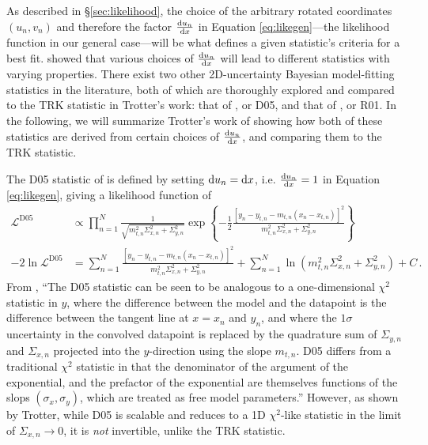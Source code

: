 
As described in \S\ref{sec:likelihood}, the choice of the arbitrary rotated coordinates $(u_n,v_n)$ and therefore the factor $\dv{u_n}{x}$ in Equation \eqref{eq:likegen}---the likelihood function in our general case---will be what defines a given statistic's criteria for a best fit. \textcite{trotter} showed that various choices of $\dv{u_n}{x}$ will lead to different statistics with varying properties. There exist two other 2D-uncertainty Bayesian model-fitting statistics in the literature, both of which are thoroughly explored and compared to the TRK statistic in Trotter's work: that of \textcite{d05fits}, or D05, and that of \textcite{r01}, or R01. In the following, we will summarize Trotter's work of showing how both of these statistics are derived from certain choices of $\dv{u_n}{x}$, and comparing them to the TRK statistic.

The D05 statistic of \textcite{d05fits} is defined by setting $\mathop{}\!\mathrm{d} u_n = \mathop{}\!\mathrm{d} x$, i.e. $\dv{u_n}{x}=1$ in Equation \eqref{eq:likegen}, giving a likelihood function of
\begin{align}\label{eq:D05}
\mathcal{L}^\mathrm{D05} & \propto \prod_{n=1}^{N}{ \frac{1}{\sqrt{m_{t,n}^2\Sigma_{x,n}^2+\Sigma_{y,n}^2}}\exp\left\{-\frac{1}{2}\frac{\left[y_n-y_{t,n}-m_{t,n}(x_n-x_{t,n})\right]^2}{m_{t,n}^2\Sigma_{x,n}^2+\Sigma_{y,n}^2}\right\}} \nonumber \\
-2\ln\mathcal{L}^\mathrm{D05} & =  \sum_{n=1}^{N}{\frac{\left[y_n-y_{t,n}-m_{t,n}(x_n-x_{t,n})\right]^2}{m_{t,n}^2\Sigma_{x,n}^2+\Sigma_{y,n}^2}} + \sum_{n=1}^{N}\ln(m_{t,n}^2\Sigma_{x,n}^2+\Sigma_{y,n}^2) + C \, .
\end{align}
From \textcite{trotter}, ``The D05 statistic can be seen to be analogous to a one-dimensional $\chi^2$ statistic in $y$, where the difference between the model and the datapoint is the difference between the tangent line at $x=x_n$ and $y_n$, and where the $1\sigma$ uncertainty in the convolved datapoint is replaced by the quadrature sum of $\Sigma_{y,n}$ and $\Sigma_{x,n}$ projected into the $y$-direction using the slope $m_{t,n}$. D05 differs from a traditional $\chi^2$ statistic in that the denominator of the argument of the exponential, and the prefactor of the exponential are themselves functions of the slops $(\sigma_x,\sigma_y)$, which are treated as free model parameters.'' However, as shown by Trotter, while D05 is scalable and reduces to a 1D $\chi^2$-like statistic in the limit of $\Sigma_{x,n}\rightarrow 0$, it is \textit{not} invertible, unlike the TRK statistic.

